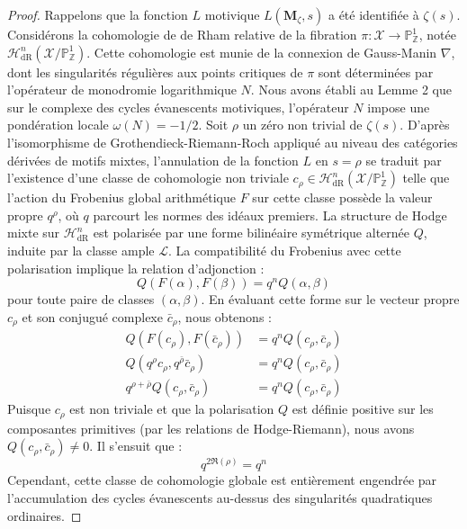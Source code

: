 \documentclass[
]{article}
\begin{document}
\begin{proof}
Rappelons que la fonction $L$ motivique $L(\mathbf{M}_{\zeta}, s)$ a été identifiée à $\zeta(s)$.
Considérons la cohomologie de de Rham relative de la fibration $\pi : \mathcal{X} \to \mathbb{P}^1_{\mathbb{Z}}$, notée $\mathcal{H}^n_{\mathrm{dR}}(\mathcal{X}/\mathbb{P}^1_{\mathbb{Z}})$.
Cette cohomologie est munie de la connexion de Gauss-Manin $\nabla$, dont les singularités régulières aux points critiques de $\pi$ sont déterminées par l'opérateur de monodromie logarithmique $N$.
Nous avons établi au Lemme 2 que sur le complexe des cycles évanescents motiviques, l'opérateur $N$ impose une pondération locale $\omega(N) = -1/2$.
Soit $\rho$ un zéro non trivial de $\zeta(s)$.
D'après l'isomorphisme de Grothendieck-Riemann-Roch appliqué au niveau des catégories dérivées de motifs mixtes, l'annulation de la fonction $L$ en $s = \rho$ se traduit par l'existence d'une classe de cohomologie non triviale $c_{\rho} \in \mathcal{H}^n_{\mathrm{dR}}(\mathcal{X}/\mathbb{P}^1_{\mathbb{Z}})$ telle que l'action du Frobenius global arithmétique $F$ sur cette classe possède la valeur propre $q^{\rho}$, où $q$ parcourt les normes des idéaux premiers.
La structure de Hodge mixte sur $\mathcal{H}^n_{\mathrm{dR}}$ est polarisée par une forme bilinéaire symétrique alternée $Q$, induite par la classe ample $\mathcal{L}$.
La compatibilité du Frobenius avec cette polarisation implique la relation d'adjonction :
\begin{equation*}
Q(F(\alpha), F(\beta)) = q^{n} Q(\alpha, \beta)
\end{equation*}
pour toute paire de classes $(\alpha, \beta)$.
En évaluant cette forme sur le vecteur propre $c_{\rho}$ et son conjugué complexe $\bar{c}_{\rho}$, nous obtenons :
\begin{align*}
Q(F(c_{\rho}), F(\bar{c}_{\rho})) &= q^n Q(c_{\rho}, \bar{c}_{\rho}) \\
Q(q^{\rho} c_{\rho}, q^{\bar{\rho}} \bar{c}_{\rho}) &= q^n Q(c_{\rho}, \bar{c}_{\rho}) \\
q^{\rho + \bar{\rho}} Q(c_{\rho}, \bar{c}_{\rho}) &= q^n Q(c_{\rho}, \bar{c}_{\rho})
\end{align*}
Puisque $c_{\rho}$ est non triviale et que la polarisation $Q$ est définie positive sur les composantes primitives (par les relations de Hodge-Riemann), nous avons $Q(c_{\rho}, \bar{c}_{\rho}) \neq 0$.
Il s'ensuit que :
\begin{equation*}
q^{2\Re(\rho)} = q^n
\end{equation*}
Cependant, cette classe de cohomologie globale est entièrement engendrée par l'accumulation des cycles évanescents au-dessus des singularités quadratiques ordinaires.

\end{proof}
\end{document}
